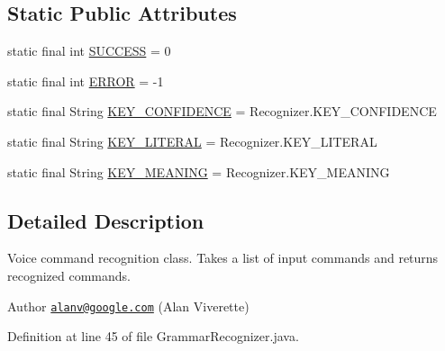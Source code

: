 \subsection*{Static Public Attributes}
\begin{DoxyCompactItemize}
\item 
static final int \hyperlink{classcom_1_1googlecode_1_1eyesfree_1_1voicecontrol_1_1_grammar_recognizer_a2725b39cfa9b27f08885011fac773584}{S\-U\-C\-C\-E\-S\-S} = 0
\item 
static final int \hyperlink{classcom_1_1googlecode_1_1eyesfree_1_1voicecontrol_1_1_grammar_recognizer_a5e17fa7461528dfc7eb4360c07360b80}{E\-R\-R\-O\-R} = -\/1
\item 
static final String \hyperlink{classcom_1_1googlecode_1_1eyesfree_1_1voicecontrol_1_1_grammar_recognizer_adb985941250757b2c8cdc4ac5713a4e9}{K\-E\-Y\-\_\-\-C\-O\-N\-F\-I\-D\-E\-N\-C\-E} = Recognizer.\-K\-E\-Y\-\_\-\-C\-O\-N\-F\-I\-D\-E\-N\-C\-E
\item 
static final String \hyperlink{classcom_1_1googlecode_1_1eyesfree_1_1voicecontrol_1_1_grammar_recognizer_aa0198125888a9433fb8900ca98dbd0b3}{K\-E\-Y\-\_\-\-L\-I\-T\-E\-R\-A\-L} = Recognizer.\-K\-E\-Y\-\_\-\-L\-I\-T\-E\-R\-A\-L
\item 
static final String \hyperlink{classcom_1_1googlecode_1_1eyesfree_1_1voicecontrol_1_1_grammar_recognizer_a328c5d1b90c9f0c0368414ec6c046039}{K\-E\-Y\-\_\-\-M\-E\-A\-N\-I\-N\-G} = Recognizer.\-K\-E\-Y\-\_\-\-M\-E\-A\-N\-I\-N\-G
\end{DoxyCompactItemize}


\subsection{Detailed Description}
Voice command recognition class. Takes a list of input commands and returns recognized commands.

\begin{DoxyAuthor}{Author}
\href{mailto:alanv@google.com}{\tt alanv@google.\-com} (Alan Viverette) 
\end{DoxyAuthor}


Definition at line 45 of file Grammar\-Recognizer.\-java.



